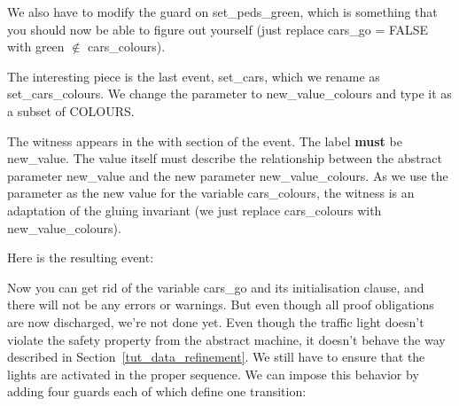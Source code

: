 We also have to modify the guard on \textsf{set\_peds\_green}, which is something that you should now be able to figure out yourself (just replace \textsf{cars\_go = FALSE} with \textsf{green} $\notin$ \textsf{cars\_colours}).

The interesting piece is the last event, \textsf{set\_cars}, which we rename as \textsf{set\_cars\_colours}.  We change the parameter to \textsf{new\_value\_colours} and type it as a subset of \textsf{COLOURS}.

The witness appears in the \textsf{with} section of the event.  The label \textbf{must} be \textsf{new\_value}.  The value itself must describe the relationship between the abstract parameter \textsf{new\_value} and the new parameter \textsf{new\_value\_colours}.  As we use the parameter as the new value for the variable \textsf{cars\_colours}, the witness is an adaptation of the gluing invariant (we just replace \textsf{cars\_colours} with \textsf{new\_value\_colours}).


Here is the resulting event:


Now you can get rid of the variable \textsf{cars\_go} and its initialisation clause, and there will not be any errors or warnings. But even though all proof obligations are now discharged, we're not done yet. Even though the traffic light doesn't violate the safety property from the abstract machine, it doesn't behave the way described in Section~\ref{tut_data_refinement}.  We still have to ensure that the lights are activated in the proper sequence.  We can impose this behavior by adding four guards each of which define one transition:

